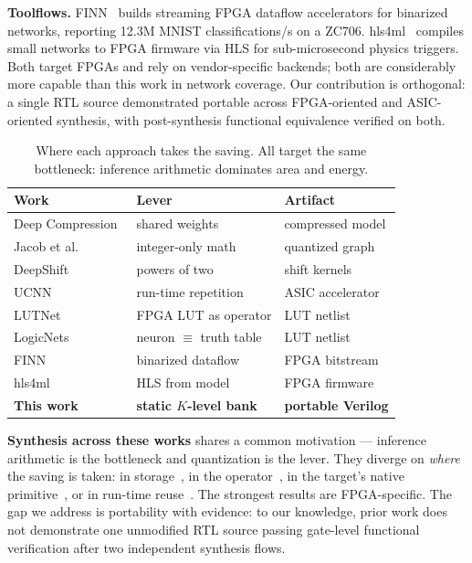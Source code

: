 \documentclass[conference]{IEEEtran}
\begin{document}
\textbf{Toolflows.} FINN~\cite{finn} builds streaming FPGA dataflow
accelerators for binarized networks, reporting 12.3M MNIST classifications/s on
a ZC706. hls4ml~\cite{hls4ml} compiles small networks to FPGA firmware via HLS
for sub-microsecond physics triggers. Both target FPGAs and rely on
vendor-specific backends; both are considerably more capable than this work in
network coverage. Our contribution is orthogonal: a single RTL source
demonstrated portable across FPGA-oriented and ASIC-oriented synthesis, with
post-synthesis functional equivalence verified on both.

\begin{table}[t]
\centering
\caption{Where each approach takes the saving. All target the same bottleneck:
inference arithmetic dominates area and energy.}
\label{tab:related}
\footnotesize
\begin{tabular}{@{}llp{2.05cm}@{}}
\toprule
Work & Lever & Artifact \\
\midrule
Deep Compression~\cite{deepcompression} & shared weights & compressed model \\
Jacob et al.~\cite{jacob} & integer-only math & quantized graph \\
DeepShift~\cite{deepshift} & powers of two & shift kernels \\
UCNN~\cite{ucnn} & run-time repetition & ASIC accelerator \\
LUTNet~\cite{lutnet} & FPGA LUT as operator & LUT netlist \\
LogicNets~\cite{logicnets} & neuron $\equiv$ truth table & LUT netlist \\
FINN~\cite{finn} & binarized dataflow & FPGA bitstream \\
hls4ml~\cite{hls4ml} & HLS from model & FPGA firmware \\
\midrule
\textbf{This work} & \textbf{static $K$-level bank} & \textbf{portable Verilog} \\
\bottomrule
\end{tabular}
\end{table}

\textbf{Synthesis across these works} shares a common motivation --- inference
arithmetic is the bottleneck and quantization is the lever. They diverge on
\emph{where} the saving is taken: in storage~\cite{deepcompression}, in the
operator~\cite{deepshift}, in the target's native primitive~\cite{lutnet,
logicnets}, or in run-time reuse~\cite{ucnn}. The strongest results are
FPGA-specific. The gap we address is portability with evidence: to our
knowledge, prior work does not demonstrate one unmodified RTL source passing
gate-level functional verification after two independent synthesis flows.
\end{document}
